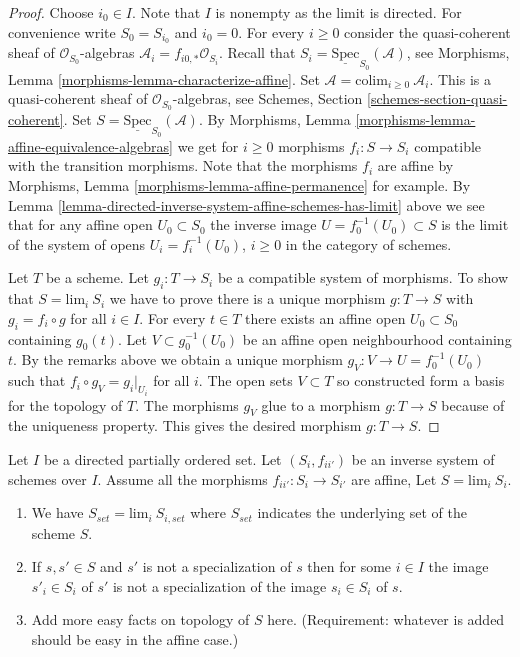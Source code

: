 \begin{proof}
Choose $i_0 \in I$. Note that $I$ is nonempty as the limit is directed.
For convenience write $S_0 = S_{i_0}$ and $i_0 = 0$.
For every $i \geq 0$ consider the quasi-coherent sheaf of
$\mathcal{O}_{S_0}$-algebras $\mathcal{A}_i = f_{i0, *}\mathcal{O}_{S_i}$.
Recall that $S_i = \underline{\text{Spec}}_{S_0}(\mathcal{A})$,
see Morphisms, Lemma \ref{morphisms-lemma-characterize-affine}.
Set $\mathcal{A} = \text{colim}_{i \geq 0}\ \mathcal{A}_i$.
This is a quasi-coherent sheaf of $\mathcal{O}_{S_0}$-algebras,
see Schemes, Section \ref{schemes-section-quasi-coherent}.
Set $S = \underline{\text{Spec}}_{S_0}(\mathcal{A})$.
By Morphisms, Lemma \ref{morphisms-lemma-affine-equivalence-algebras}
we get for $i \geq 0$ morphisms $f_i : S \to S_i$ compatible with
the transition morphisms. Note that the morphisms $f_i$ are
affine by Morphisms, Lemma \ref{morphisms-lemma-affine-permanence} for example.
By Lemma \ref{lemma-directed-inverse-system-affine-schemes-has-limit} above
we see that for any affine open $U_0 \subset S_0$ the
inverse image $U = f_0^{-1}(U_0) \subset S$ is the limit of the
system of opens $U_i = f_i^{-1}(U_0)$, $i \geq 0$ in the
category of schemes.

\medskip\noindent
Let $T$ be a scheme. Let $g_i : T \to S_i$ be a compatible system
of morphisms. To show that $S = \text{lim}_i\ S_i$ we have
to prove there is a unique morphism $g : T \to S$ with
$g_i = f_i \circ g$ for all $i \in I$.
For every $t \in T$ there exists an affine open
$U_0 \subset S_0$ containing $g_0(t)$. Let $V \subset g_0^{-1}(U_0)$
be an affine open neighbourhood containing $t$.
By the remarks above we obtain a unique morphism
$g_V : V \to U = f_0^{-1}(U_0)$ such that $f_i \circ g_V = g_i|_{U_i}$
for all $i$. The open sets $V \subset T$ so constructed form
a basis for the topology of $T$. The morphisms $g_V$ glue to a morphism
$g : T \to S$ because of the uniqueness property. This gives the
desired morphism $g : T \to S$.
\end{proof}

\begin{lemma}
\label{lemma-topology-limit}
Let $I$ be a directed partially ordered set.
Let $(S_i, f_{ii'})$ be an inverse system of schemes over $I$.
Assume all the morphisms $f_{ii'} : S_i \to S_{i'}$ are affine,
Let $S = \text{lim}_i\ S_i$.
\begin{enumerate}
\item We have $S_{set} = \text{lim}_i\ S_{i, set}$ where $S_{set}$
indicates the underlying set of the scheme $S$.
\item If $s, s' \in S$ and $s'$ is not a specialization of $s$
then for some $i \in I$ the image $s'_i \in S_i$ of $s'$ is not
a specialization of the image $s_i \in S_i$ of $s$.
\item Add more easy facts on topology of $S$ here.
(Requirement: whatever is added should be easy in the affine case.)
\end{enumerate}
\end{lemma}

